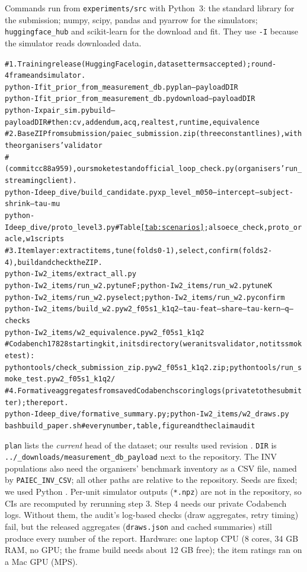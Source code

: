 \documentclass{article}
\begin{document}
Commands run from \texttt{experiments/src} with Python~3: the standard library for the submission; numpy, scipy, pandas and pyarrow for the simulators; \texttt{huggingface\_hub} and scikit-learn for the download and fit. They use \texttt{-I} because the simulator reads downloaded data.
\begin{alltt}\scriptsize
# 1. Training release (Hugging Face login, dataset terms accepted); round-4 frame and simulator.
python -I fit_prior_from_measurement_db.py plan --payload DIR
python -I fit_prior_from_measurement_db.py download --payload DIR
python -I xpair_sim.py build --payload DIR   # then: cv, addendum, acq, realtest, runtime, equivalence
# 2. Base ZIP from submission/paiec_submission.zip (three constant lines), with the organisers' validator
#    (commit cc88a959), our smoke test and official_loop_check.py (organisers' run_streaming client).
python -I deep_dive/build_candidate.py xp_level_m050 --intercept \SelInterceptRaw --subject-shrink \SelSubjectShrinkRaw --tau-mu \SelTauMuRaw
python -I deep_dive/proto_level3.py          # Table \ref{tab:scenarios}; also ece_check, proto_oracle, w1 scripts
# 3. Item layer: extract items, tune (folds 0-1), select, confirm (folds 2-4), build and check the ZIP.
python -I w2_items/extract_all.py
python -I w2_items/run_w2.py tune F;  python -I w2_items/run_w2.py tune K
python -I w2_items/run_w2.py select;  python -I w2_items/run_w2.py confirm
python -I w2_items/build_w2.py w2_f05s1_k1q2 --tau-feat \WtTauFeat{} --share \WtFeatShare{} --tau-kern \WtTauKern{} --q \WtKernQ{} --checks
python -I w2_items/w2_equivalence.py w2_f05s1_k1q2
#    Codabench 17828 starting kit, in its directory (we ran its validator, not its smoke test):
python tools/check_submission_zip.py w2_f05s1_k1q2.zip;  python tools/run_smoke_test.py w2_f05s1_k1q2/
# 4. Formative aggregates from saved Codabench scoring logs (private to the submitter); the report.
python -I deep_dive/formative_summary.py;    python -I w2_items/w2_draws.py
bash build_paper.sh                          # every number, table, figure and the claim audit
\end{alltt}
\texttt{plan} lists the \emph{current} head of the dataset; our results used revision \texttt{\FitRevisionShort}. \texttt{DIR} is \texttt{../\_downloads/measurement\_db\_payload} next to the repository. The INV populations also need the organisers' benchmark inventory as a CSV file, named by \texttt{PAIEC\_INV\_CSV}; all other paths are relative to the repository. Seeds are fixed; we used Python \PyVersion. Per-unit simulator outputs (\texttt{*.npz}) are not in the repository, so CIs are recomputed by rerunning step 3. Step 4 needs our private Codabench logs. Without them, the audit's log-based checks (draw aggregates, retry timing) fail, but the released aggregates (\texttt{draws.json} and cached summaries) still produce every number of the report. Hardware: one laptop CPU (8 cores, 34 GB RAM, no GPU; the frame build needs about 12 GB free); the item ratings ran on a Mac GPU (MPS).
\end{document}
